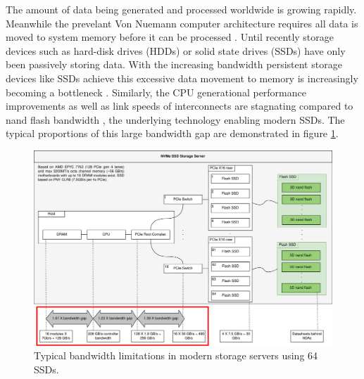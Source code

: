 The amount of data being generated and processed worldwide is growing rapidly.
Meanwhile the prevelant Von Nuemann computer architecture requires all data is 
moved to system memory before it can be processed \cite{2018-neumann-bottleneck}.
Until recently storage devices such as hard-disk drives (HDDs) or solid state
drives (SSDs) have only been passively storing data. With the increasing
bandwidth persistent storage devices like SSDs achieve this excessive data
movement to memory is increasingly becoming a bottleneck \cite{2014-micro-ndp}.
Similarly, the CPU generational performance
improvements \cite{2016-western-digital} as well as link speeds of interconnects
are stagnating compared to nand flash bandwidth \cite{10.1145/3286588}, the
underlying technology enabling modern SSDs. The typical proportions of this
large bandwidth gap are demonstrated in figure \ref{figure:storagebottleneck}.

\begin{figure}
    \centering
	\includegraphics[width=1\textwidth]{resources/images/storage-bottleneck.png}
	\caption{Typical bandwidth limitations in modern storage servers using 64
        SSDs.}
    \label{figure:storagebottleneck}
\end{figure}


